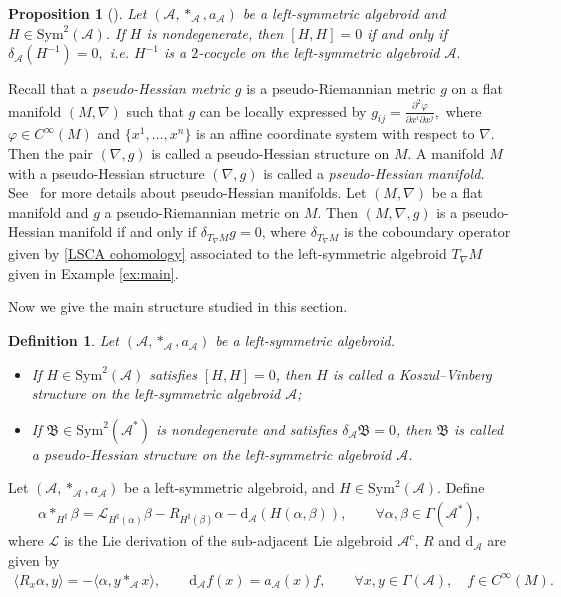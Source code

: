 \documentclass[10pt,a4paper]{amsart}
\numberwithin{equation}{section}
\newtheorem{pro}[thm]{Proposition}
\newtheorem{defi}[thm]{Definition}
\newcommand{\huaA}{\mathcal{A}}
\newcommand{\huaL}{\mathcal{L}}
\newcommand{\frkB}{\mathfrak B}
\newcommand{\CWM}{C^{\infty}(M)}
\newcommand{\dM}{\mathrm{d}}
\newcommand{\Sym}{\mathrm{Sym}}
\begin{document}
\begin{pro}[\cite{lsb2}]%
Let $(\huaA,\ast_\huaA,a_\huaA)$ be a left-symmetric algebroid and $H\in \Sym^2(\huaA)$. If $H$ is nondegenerate, then
 $[ H,H]=0$ if and only if $\delta_\huaA (H^{-1})=0,$ i.e. $H^{-1}$ is a $2$-cocycle on the left-symmetric algebroid $\huaA.$

\end{pro}

Recall that a {\it pseudo-Hessian metric} $g$ is a
pseudo-Riemannian metric $g$ on a flat manifold $(M,\nabla)$ such
that $g$ can be locally expressed by
$g_{ij}=\frac{\partial^2\varphi}{\partial x^i\partial x^j},$ where
$\varphi\in\CWM$ and $\big\{x^1,\dots,x^n\big\}$ is an affine coordinate
system with respect to $\nabla$. Then the pair $(\nabla,g)$ is called a
pseudo-Hessian structure on $M$. A manifold $M$ with a
pseudo-Hessian structure $(\nabla,g)$ is called a {\it pseudo-Hessian manifold.}
 See~\cite{Geometry-of-Hessian-structures} for more
details about pseudo-Hessian manifolds.
 Let $(M,\nabla)$ be a flat manifold and $g$ a pseudo-Riemannian metric on $M$. Then $(M,\nabla,g)$ is a pseudo-Hessian manifold if and only if $\delta_{T_\nabla M} g=0$, where $\delta_{T_\nabla M}$ is the coboundary operator given by \eqref{LSCA cohomology} associated to the left-symmetric algebroid $T_\nabla M $ given in Example \ref{ex:main}.


Now we give the main structure studied in this section.


\begin{defi}
Let $(\huaA,\ast_\huaA,a_\huaA)$ be a left-symmetric algebroid.
 \begin{itemize}\itemsep=0pt
 \item[$(i)$] If $H\in \Sym^2(\huaA)$ satisfies $[ H,H]=0$, then $H$ is called a {\it Koszul--Vinberg structure} on the left-symmetric algebroid $\huaA$;
\item[$(ii)$] If $\frkB\in \Sym^2(\huaA^*)$ is nondegenerate and satisfies $\delta_\huaA\frkB=0$, then $\frkB$ is called a {\it pseudo-Hessian structure} on the left-symmetric algebroid $\huaA$.
 \end{itemize}\end{defi}

Let $(\huaA,\ast_\huaA,a_\huaA)$ be a left-symmetric algebroid, and $H\in \Sym^2(\huaA)$. Define
\begin{gather}\label{eq:multiplication-H}
\alpha\ast_{H^\sharp} \beta=\huaL_{H^\sharp(\alpha)}\beta-R_{H^\sharp(\beta)}\alpha-{\dM_\huaA} (H(\alpha,\beta)), \qquad\forall
\alpha,\beta\in\Gamma(\huaA^*),
\end{gather}
where $\huaL$ is the Lie derivation of the sub-adjacent Lie algebroid $\huaA^c$, $R$ and $\dM_\huaA$ are given by
\begin{gather*}
\langle R_x\alpha,y\rangle=-\langle\alpha,y\ast_\huaA x\rangle,\qquad
\dM_\huaA f(x)=a_\huaA(x)f,\qquad
\forall x,y\in\Gamma(\huaA),\quad f\in \CWM.
\end{gather*}
\end{document}
